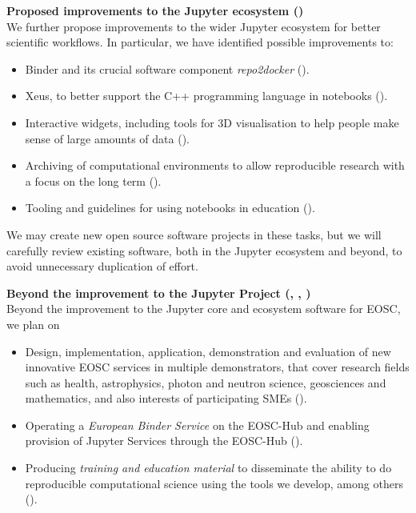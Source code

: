 \medskip
\noindent\textbf{Proposed improvements to the Jupyter ecosystem ()}\\
We further propose improvements to the wider Jupyter ecosystem for
better scientific workflows. In particular, we have identified
possible improvements to:

\begin{itemize}
  \item Binder and its crucial software component \emph{repo2docker}
    ().

  \item Xeus, to better support the C++ programming language in notebooks
    ().

  \item Interactive widgets, including tools for 3D visualisation to help
    people make sense of large amounts of data
    ().

  \item Archiving of computational environments to allow reproducible research
    with a focus on the long term ().

  \item Tooling and guidelines
    for using notebooks in education
    ().

\end{itemize}

We may create new open source software projects in these tasks,
but we will carefully review existing software, both in the
Jupyter ecosystem and beyond, to avoid unnecessary duplication of effort.

\medskip\noindent\textbf{Beyond the improvement to the Jupyter Project
  (, , )}\\
Beyond the improvement to the Jupyter core and ecosystem software for EOSC, we plan on
\begin{itemize}
\item Design, implementation, application, demonstration and
  evaluation of new innovative EOSC services
  in multiple demonstrators, that cover research fields such as
  health, astrophysics, photon and neutron science, geosciences and
  mathematics, and also interests of participating SMEs ().
\item Operating a \emph{European Binder Service} on the EOSC-Hub and
  enabling provision of Jupyter Services through the EOSC-Hub ().
\item Producing \emph{training and education material} to disseminate
  the ability to do reproducible computational science using the tools
  we develop, among others ().
\end{itemize}

